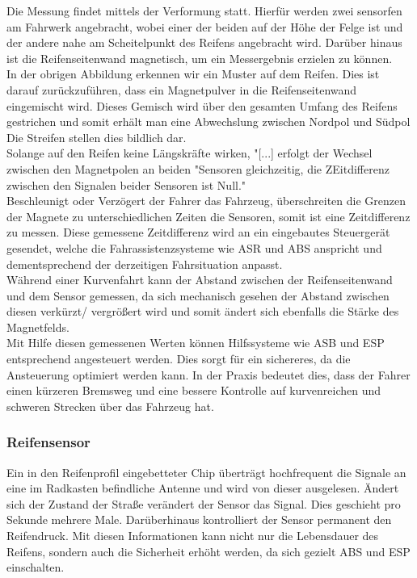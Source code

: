 				\begin{flushleft}
					
					Die Messung findet mittels der Verformung statt. Hierfür werden zwei sensorfen am Fahrwerk angebracht, wobei einer der beiden auf der Höhe der Felge ist und der andere nahe am Scheitelpunkt des Reifens angebracht wird. Darüber hinaus ist die Reifenseitenwand magnetisch, um ein Messergebnis erzielen zu können.\\
					In der obrigen Abbildung erkennen wir ein Muster auf dem Reifen. Dies ist darauf zurückzuführen, dass ein Magnetpulver in die Reifenseitenwand eingemischt wird. Dieses Gemisch wird über den gesamten Umfang des Reifens gestrichen und somit erhält man eine Abwechslung zwischen Nordpol und Südpol Die Streifen stellen dies bildlich dar.\\
					Solange auf den Reifen keine Längskräfte wirken, "[...] erfolgt der Wechsel zwischen den Magnetpolen an beiden "Sensoren gleichzeitig, die ZEitdifferenz zwischen den Signalen beider Sensoren ist Null."\cite{TS20} \\
					Beschleunigt oder Verzögert der Fahrer das Fahrzeug, überschreiten die Grenzen der Magnete zu unterschiedlichen Zeiten die Sensoren, somit ist eine Zeitdifferenz zu messen. Diese gemessene Zeitdifferenz wird an ein eingebautes Steuergerät gesendet, welche die Fahrassistenzsysteme wie ASR und ABS anspricht und dementsprechend der derzeitigen Fahrsituation anpasst.\\
					Während einer Kurvenfahrt kann der Abstand zwischen der Reifenseitenwand und dem Sensor gemessen, da sich mechanisch gesehen der Abstand zwischen diesen verkürzt/ vergrößert wird und somit ändert sich ebenfalls die Stärke des Magnetfelds.\\
					Mit Hilfe diesen gemessenen Werten können Hilfssysteme wie ASB und ESP entsprechend angesteuert werden. Dies sorgt für ein sichereres, da die Ansteuerung optimiert werden kann. In der Praxis bedeutet dies, dass der Fahrer einen kürzeren Bremsweg und eine bessere Kontrolle auf kurvenreichen und schweren Strecken über das Fahrzeug hat.
					
				\end{flushleft}
				
			\subsubsection{Reifensensor}
				Ein in den Reifenprofil eingebetteter Chip überträgt hochfrequent die Signale an eine im Radkasten befindliche Antenne und wird von dieser ausgelesen. Ändert sich der Zustand der Straße verändert der Sensor das Signal. Dies geschieht pro Sekunde mehrere Male. Darüberhinaus kontrolliert der Sensor permanent den Reifendruck. Mit diesen Informationen kann nicht nur die Lebensdauer des Reifens, sondern auch die Sicherheit erhöht werden, da sich gezielt ABS und ESP einschalten.\\
				
